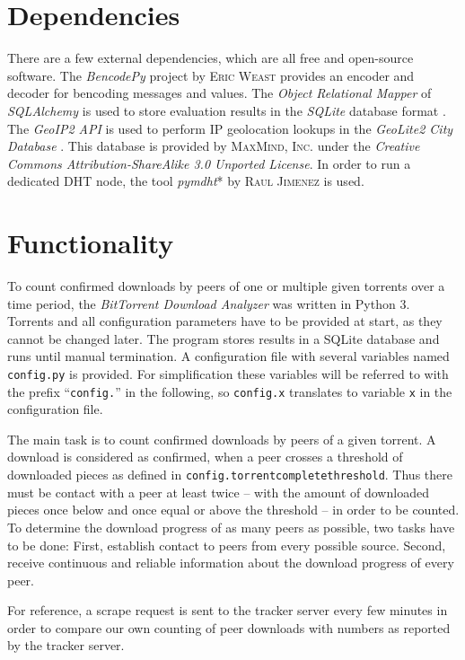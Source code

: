 \documentclass[10pt, a4paper, twoside, headsepline]{scrbook}
\renewcommand{\_}{\origunderscore\allowbreak}
\newcommand{\config}[1]{\texttt{config.\allowbreak #1}}
\begin{document}
\section{Dependencies}
There are a few external dependencies, which are all free and open-source software. The \emph{BencodePy} project by \textsc{Eric Weast} \cite{bencodepy} provides an encoder and decoder for bencoding messages and values. The \emph{Object Relational Mapper} of \emph{SQLAlchemy} \cite{sqlalchemy} is used to store evaluation results in the \emph{SQLite} database format \cite{sqlite}. The \emph{GeoIP2 API} \cite{geoip2-api} is used to perform IP geolocation lookups in the \emph{GeoLite2 City Database} \cite{geolite2-db}. This database is provided by \textsc{MaxMind, Inc.} under the \emph{Creative Commons Attribution-ShareAlike 3.0 Unported License}. In order to run a dedicated DHT node, the tool \emph{pymdht}* by \textsc{Raul Jimenez} \cite{pymdht} is used.

\section{Functionality}
To count confirmed downloads by peers of one or multiple given torrents over a time period, the \emph{BitTorrent Download Analyzer} was written in Python 3. Torrents and all configuration parameters have to be provided at start, as they cannot be changed later. The program stores results in a SQLite database and runs until manual termination. A configuration file with several variables named \texttt{config.py} is provided. For simplification these variables will be referred to with the prefix ``\texttt{config.}'' in the following, so \config{x} translates to variable \texttt{x} in the configuration file.

The main task is to count confirmed downloads by peers of a given torrent. A download is considered as confirmed, when a peer crosses a threshold of downloaded pieces as defined in \config{torrent\_complete\_threshold}. Thus there must be contact with a peer at least twice -- with the amount of downloaded pieces once below and once equal or above the threshold -- in order to be counted. To determine the download progress of as many peers as possible, two tasks have to be done: First, establish contact to peers from every possible source. Second, receive continuous and reliable information about the download progress of every peer.

For reference, a scrape request is sent to the tracker server every few minutes in order to compare our own counting of peer downloads with numbers as reported by the tracker server.
\end{document}
